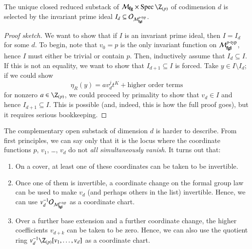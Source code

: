 \begin{theorem}\label{LandwebersClassificationOfClosedSubstacks}
The unique closed reduced substack of $\moduli{fg} \times \Spec \Z_{(p)}$ of codimension $d$ is selected by the invariant prime ideal $I_d \subseteq \mathcal{O}_{\mathcal{M}_{\mathbf{fgl}}^{p\text{-}\mathrm{typ}}}$.
\end{theorem}
\begin{proof}[Proof sketch]
We want to show that if $I$ is an invariant prime ideal, then $I = I_d$ for some $d$.  To begin, note that $v_0 = p$ is the only invariant function on $\mathcal{M}_{\mathbf{fgl}}^{p\text{-}\mathrm{typ}}$, hence $I$ must either be trivial or contain $p$.  Then, inductively assume that $I_d \subseteq I$.  If this is not an equality, we want to show that $I_{d+1} \subseteq I$ is forced.  Take $y \in I \setminus I_d$; if we could show \[\eta_R(y) = a v_d^j t^K + \text{higher order terms}\] for nonzero $a \in \Z_{(p)}$, we could proceed by primality to show that $v_d \in I$ and hence $I_{d+1} \subseteq I$.  This is possible (and, indeed, this is how the full proof goes), but it requires serious bookkeeping.
\end{proof}

\begin{remark}\label{OpenSubstacksOfMfg}
The complementary open substack of dimension $d$ is harder to describe.%
From first principles, we can say only that it is the locus where the coordinate functions $p$, $v_1$, \ldots, $v_d$ do not \emph{all simultaneously vanish}.  It turns out that:
\begin{enumerate}
\item On a cover, at least one of these coordinates can be taken to be invertible.\item Once one of them is invertible, a coordinate change on the formal group law can be used to make $v_d$ (and perhaps others in the list) invertible.  Hence, we can use $v_d^{-1} \mathcal{O}_{\mathcal{M}_{\mathbf{fgl}}^{p\text{-}\mathrm{typ}}}$ as a coordinate chart.
\item Over a further base extension and a further coordinate change, the higher coefficients $v_{d+k}$ can be taken to be zero.  Hence, we can also use the quotient ring $v_d^{-1} \Z_{(p)}[v_1, \ldots, v_d]$ as a coordinate chart.
\end{enumerate}
\end{remark}

